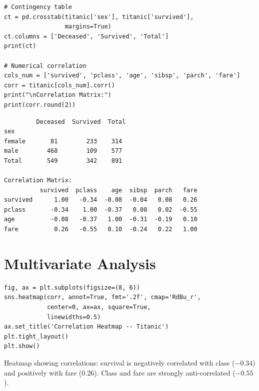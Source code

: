 \begin{codeblock}[title=\textbf{Python}]
\begin{verbatim}
# Contingency table
ct = pd.crosstab(titanic['sex'], titanic['survived'],
                 margins=True)
ct.columns = ['Deceased', 'Survived', 'Total']
print(ct)

# Numerical correlation
cols_num = ['survived', 'pclass', 'age', 'sibsp', 'parch', 'fare']
corr = titanic[cols_num].corr()
print("\nCorrelation Matrix:")
print(corr.round(2))
\end{verbatim}
\end{codeblock}

\begin{codeoutput}
\begin{verbatim}
         Deceased  Survived  Total
sex
female       81        233    314
male        468        109    577
Total       549        342    891

Correlation Matrix:
          survived  pclass    age  sibsp  parch   fare
survived      1.00   -0.34  -0.08  -0.04   0.08   0.26
pclass       -0.34    1.00  -0.37   0.08   0.02  -0.55
age          -0.08   -0.37   1.00  -0.31  -0.19   0.10
fare          0.26   -0.55   0.10  -0.24   0.22   1.00
\end{verbatim}
\end{codeoutput}

\section{Multivariate Analysis}

\begin{codeblock}[title=\textbf{Python}]
\begin{verbatim}
fig, ax = plt.subplots(figsize=(8, 6))
sns.heatmap(corr, annot=True, fmt='.2f', cmap='RdBu_r',
            center=0, ax=ax, square=True,
            linewidths=0.5)
ax.set_title('Correlation Heatmap -- Titanic')
plt.tight_layout()
plt.show()
\end{verbatim}
\end{codeblock}

\begin{codeoutput}
Heatmap showing correlations: survival is negatively correlated with class ($-0.34$) and positively with fare ($0.26$). Class and fare are strongly anti-correlated ($-0.55$).
\end{codeoutput}

